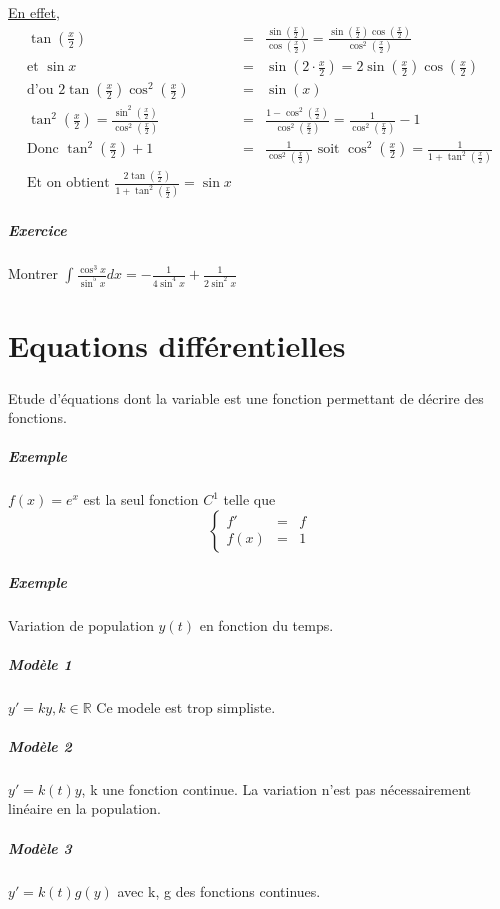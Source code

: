 \ul{En effet}, \[\begin{array}{rcl}
\tan(\frac{x}{2}) &=& \frac{\sin(\frac{x}{2})}{\cos(\frac{x}{2})} = \frac{\sin(\frac{x}{2})\cos(\frac{x}{2})}{\cos^2(\frac{x}{2})} \\
\text{et } \sin x &=& \sin(2\cdot \frac{x}{2}) = 2\sin(\frac{x}{2})\cos(\frac{x}{2}) \\
\text{d'ou } 2\tan(\frac{x}{2})\cos^2(\frac{x}{2}) &=& \sin(x) \\
\tan^2 (\frac{x}{2}) = \frac{\sin^2(\frac{x}{2})}{\cos^2(\frac{x}{2})} &=& \frac{1-\cos^2(\frac{x}{2})}{\cos^2(\frac{x}{2})} = \frac{1}{\cos^2(\frac{x}{2})} - 1 \\
\text{Donc } \tan^2(\frac{x}{2})+1 &=& \frac{1}{\cos^2(\frac{x}{2})} \text{ soit } \cos^2(\frac{x}{2}) = \frac{1}{1+\tan^2(\frac{x}{2})} \\
\text{Et on obtient } \frac{2\tan(\frac{x}{2})}{1+\tan^2(\frac{x}{2})} = \sin x \end{array}\]

\paragraph{Exercice}  Montrer $\int\frac{\cos^3 x}{\sin^5 x} dx = - \frac{1}{4 \sin^4 x} + \frac{1}{2\sin^2 x}$

\chapter{Equations différentielles}

\paragraph{} Etude d'équations dont la variable est une fonction permettant de décrire des fonctions.
\paragraph{Exemple} $f(x) = e^x$ est la seul fonction $C^1$ telle que \[\left\{\begin{array}{rcl}
	f' &=& f \\
	f(x) &=& 1 \end{array}\right.\]

\paragraph{Exemple} Variation de population $y(t)$ en fonction du temps.

\paragraph{Modèle 1} $y' = ky, k \in \mathbb{R}$ Ce modele est trop simpliste.
\paragraph{Modèle 2} $y' = k(t) y$, k une fonction continue. La variation n'est pas nécessairement linéaire en la population.
\paragraph{Modèle 3} $y' = k(t)g(y)$ avec k, g des fonctions continues. 

